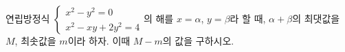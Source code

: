 연립방정식 $\begin{cases} x^2-y^2=0 \\ x^2-xy+2y^2=4 \end{cases}$의 해를 $x=\alpha$, $y=\beta$라 할 때, $\alpha+\beta$의 최댓값을 $M$, 최솟값을 $m$이라 하자. 이때 $M-m$의 값을 구하시오.
